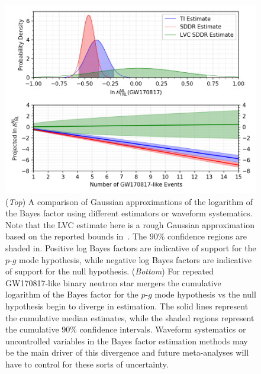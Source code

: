 \begin{figure}
\centering
\includegraphics[width=1.0\textwidth]{figs/chapter6/sim_many_gw170817_evidence_error_prop.png}
\caption{(\textit{Top}) A comparison of Gaussian approximations of the logarithm of the Bayes factor using different estimators or waveform systematics. Note that the LVC estimate here is a rough Gaussian approximation based on the reported bounds in~\cite{abbott2019constraining}. The $90 \%$ confidence regions are shaded in. Positive log Bayes factors are indicative of support for the $p$-$g$ mode hypothesis, while negative log Bayes factors are indicative of support for the null hypothesis. (\textit{Bottom}) For repeated GW170817-like binary neutron star mergers the cumulative logarithm of the Bayes factor for the $p$-$g$ mode hypothesis vs the null hypothesis begin to diverge in estimation. The solid lines represent the cumulative median estimates, while the shaded regions represent the cumulative $90 \%$ confidence intervals. Waveform systematics or uncontrolled variables in the Bayes factor estimation methods may be the main driver of this divergence and future meta-analyses will have to control for these sorts of uncertainty.}
\label{fig:sim_many_gw170817_divergent_bayes}
\end{figure}

